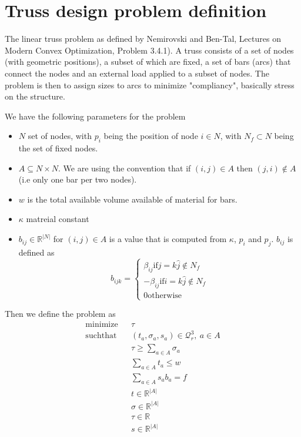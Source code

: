 \documentclass{article}
\begin{document}
\section{Truss design problem definition}

The linear truss problem as defined by Nemirovski and Ben-Tal,
Lectures on Modern Convex Optimization, Problem 3.4.1). A truss consists of a
set of nodes (with geometric positions), a subset of which are fixed, a set of bars (arcs) that connect
the nodes and an external load applied to a subset of nodes. The problem is
then to assign sizes to arcs to minimize "compliancy", basically stress on the
structure.

We have the following parameters for the problem
\begin{itemize}
\item $N$ set of nodes, with $p_i$ being the position of node $i\in N$, with $N_f\subset N$ being the set of fixed nodes.
\item $A\subseteq N\times N$. We are using the convention that if $(i,j)\in A$
    then $(j,i)\not\in A$ (i.e only one bar per two nodes). 
\item $w$ is the total available volume available of material for bars.
\item $\kappa$ matreial constant
\item $b_{ij}\in\mathbb{R}^{|N|}$ for $(i,j)\in A$ is a value that is computed from $\kappa$, $p_i$ and $p_j$. $b_{ij}$ is defined as 
    \[
        b_{ijk} = \left\{ 
            \begin{array}{l}
                \beta_{ij} \mathrm{ if } j = k\hat j\not\in N_f \\
                -\beta_{ij} \mathrm{ if } i = k\hat j\not\in N_f \\
                0 \mathrm{ otherwise}
            \end{array}
        \right.
    \]
\end{itemize}
Then we define the problem as 
\begin{eqnarray}
    \mathrm{minimize} &&  \tau \\
    \mathrm{such that} 
    && (t_a,\sigma_a,s_a)\in\mathcal{Q}^3_r,\ a\in A\\
    && \tau \geq \sum_{a\in A} \sigma_a \\
    && \sum_{a\in A} t_a \leq w \\
    && \sum_{a\in A} s_a b_a = f \\
    && t\in\mathbb{R}^{|A|}\\
    && \sigma\in\mathbb{R}^{|A|} \\
    && \tau\in\mathbb{R}\\
    && s\in\mathbb{R}^{|A|} 
\end{eqnarray}
\end{document}
